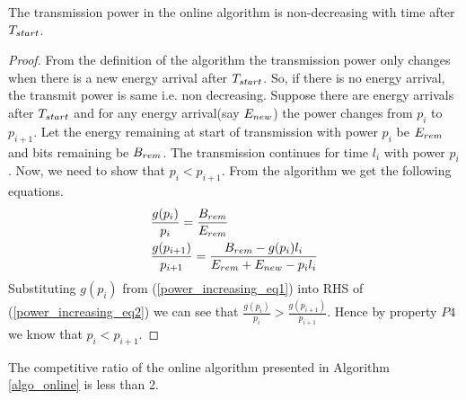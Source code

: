 \begin{lemma}
The transmission power in the online algorithm is non-decreasing with time after $T_{\mbox{\scriptsize{start}}}$.
\label{online_power}
\end{lemma}
\begin{proof}
From the definition of the algorithm the transmission power only changes when there is a new energy arrival after $T_{\mbox{\scriptsize{start}}}$. So, if there is no energy arrival, the transmit power is same i.e. non decreasing. Suppose there are energy arrivals after $T_{\mbox{\scriptsize{start}}}$ and for any energy arrival(say $E_{\mbox{\scriptsize{new}}}$) the power changes from $p_i$ to $p_{i+1}$. Let the energy remaining at start of transmission with power $p_i$ be $E_{\mbox{\scriptsize{rem}}}$ and bits remaining be $B_{\mbox{\scriptsize{rem}}}$. The transmission continues for time $l_i$ with power $p_i$. Now, we need to show that $p_i<p_{i+1}$. From the algorithm we get the following equations. 
\begin{align}
&\frac{g(p_i)}{p_i}=\frac{B_{\mbox{\scriptsize{rem}}}}{E_{\mbox{\scriptsize{rem}}}} \label{power_increasing_eq1}
\\
&\frac{g(p_{i+1})}{p_{i+1}}=\frac{B_{\mbox{\scriptsize{rem}}}-g(p_i) l_i}{E_{\mbox{\scriptsize{rem}}}+E_{\mbox{\scriptsize{new}}}-p_i l_i}\label{power_increasing_eq2}
\end{align}
Substituting $g(p_i)$ from (\ref{power_increasing_eq1}) into RHS of (\ref{power_increasing_eq2}) we can see that $\frac{g(p_i)}{p_i}>\frac{g(p_{i+1})}{p_{i+1}}$. Hence by property $P4$ we know that $p_i<p_{i+1}$.
\end{proof}
\begin{theorem}
The competitive ratio of the online algorithm presented in Algorithm \ref{algo_online} is less than 2.
\end{theorem}
